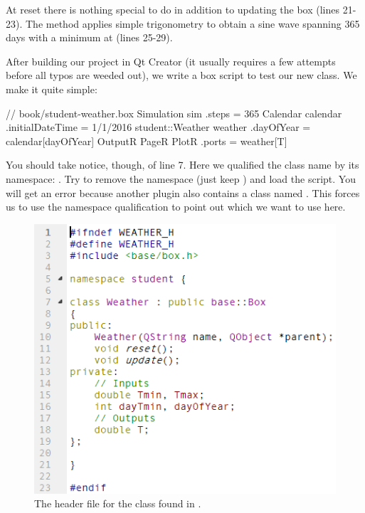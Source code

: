 At reset there is nothing special to do in addition to updating the box (lines 21-23). The  method applies  simple trigonometry to obtain a sine wave spanning 365 days with a minimum at  (lines 25-29).

After building our project in Qt Creator (it usually requires a few attempts before all typos are weeded out), we write a box script to test our new class. We make it quite simple:
\lstset{numbers=left}
\begin{boxscript}
// book/student-weather.box
Simulation sim {
  .steps = 365
  Calendar calendar {
    .initialDateTime = 1/1/2016
  }
  student::Weather weather {
    .dayOfYear = calendar[dayOfYear]
  }
  OutputR {
    PageR {
      PlotR {
        .ports = weather[T]
      }
    }
  }
}
\end{boxscript}
\lstset{numbers=none}

You should take notice, though, of line 7. Here we qualified the class name by its namespace: . Try to remove the namespace (just keep ) and load the script. You will get an error because another plugin also contains a class named . This forces us to use the namespace qualification to point out which  we want to use here.

\begin{figure}
\centering
\includegraphics[scale=0.7]{graphics/qt-creator-weather-h}
\caption{The header file for the  class found in .}
\label{fig:qt-creator-weather-h}
\end{figure}

